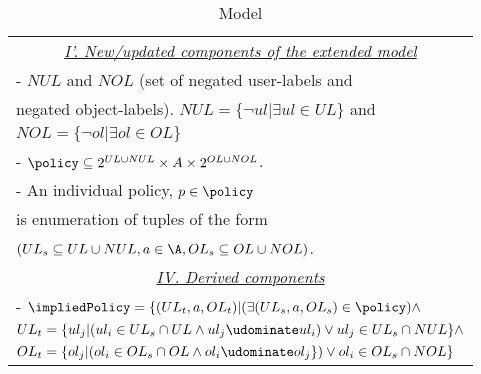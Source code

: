 \begin{table}
	\centering
	\caption{ \elabac{} Model} %
	\label{tab:labac-definition}
	\begin{tabular}{|l|}						
		\hline					
		\multicolumn{1}{|c|}{\underline{\textit{I'. New/updated components of the extended model } } }\\	
		- $NUL$ and $NOL$ (set of negated user-labels and \\ \hfill negated object-labels).  $NUL = \{ \lnot ul | \exists ul \in UL\}$ and \\ \hfill  $NOL = \{ \lnot  ol | \exists ol \in OL \}$ \\
		-  $\policy \subseteq 2^{UL \cup NUL} \times A \times 2^{OL\cup NOL}$. \\
		- An individual policy,  $p \in \policy$  \\ \hfil is enumeration of tuples of the form \\ \hfill  $( UL_s \subseteq  UL \cup NUL, a \in \A, OL_s \subseteq OL \cup NOL)$. \\
		
	 		  
		
		\multicolumn{1}{|c|}{\underline{\textit{IV. Derived components}}} \\
		- $\impliedPolicy = \{ (UL_t, a, OL_t) | ( \exists (UL_s, a, OL_s) \in \policy) \land$  \\ \hfill $UL_t=\{ ul_j | ( ul_i \in UL_s \cap UL \land ul_j \udominate ul_i) \lor ul_j \in UL_s \cap NUL \} \land$ \\ \hfill $  OL_t=\{ ol_j | (ol_i \in OL_s \cap OL \land ol_i \udominate ol_j\}) \lor ol_i \in OL_s \cap NOL \}$		\\		
	 

\end{tabular}
\end{table}
